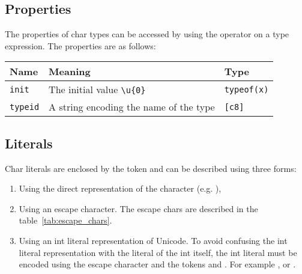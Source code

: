 \subsection{Properties}
\label{sec:orgf9fbc31}

The properties of char types can be accessed by using the \token{::} operator
on a type expression. The properties are as follows:

\begin{center}
  \vspace{-5pt}
  \begin{adjustbox}{max width=\linewidth}
    \begin{tabular}{|l|ll|}
      \hline
      Name & Meaning & Type\\[0pt]
      \hline
      \hline
      \texttt{init} & The initial value \texttt{\textbackslash{}u\{0\}} & \texttt{typeof(x)}\\[0pt]
      \hline
      \texttt{typeid} & A string encoding the name of the type & \texttt{[c8]}\\[0pt]
      \hline
    \end{tabular}
  \end{adjustbox}
\end{center}


\subsection{Literals}
\label{sec:org73c4919}

Char literals are enclosed by the token  and can be described using three forms:

\begin{enumerate}
\item Using the direct representation of the character (e.g. ),
\item Using an escape character. The escape chars are described in the
  table~\ref{tab:escape_chars}.

\item Using an int literal representation of Unicode. To avoid confusing the int
  literal representation with the literal of the int itself, the int literal
  must be encoded using the escape character  and the
  tokens \token{\{} and \token{\}}. For example
  ,  or
  .

\end{enumerate}

